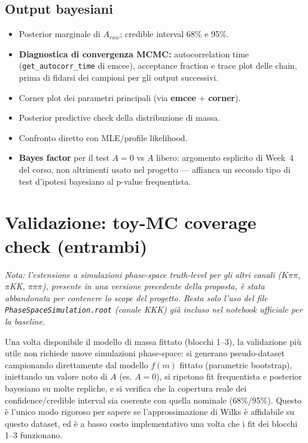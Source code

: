 \documentclass[11pt,a4paper]{article}
\begin{document}
\subsection*{Output bayesiani}
\begin{itemize}[leftmargin=1.4em]
    \item Posterior marginale di $A_{raw}$; credible interval 68\% e 95\%.
    \item \textbf{Diagnostica di convergenza MCMC:} autocorrelation time (\texttt{get\_autocorr\_time} di emcee), acceptance fraction e trace plot delle chain, prima di fidarsi dei campioni per gli output successivi.
    \item Corner plot dei parametri principali (via \textbf{emcee} + \textbf{corner}).
    \item Posterior predictive check della distribuzione di massa.
    \item Confronto diretto con MLE/profile likelihood.
    \item \textbf{Bayes factor} per il test $A=0$ vs $A$ libero: argomento esplicito di Week~4 del corso, non altrimenti usato nel progetto --- affianca un secondo tipo di test d'ipotesi bayesiano al p-value frequentista.
\end{itemize}

\section{Validazione: toy-MC coverage check \textnormal{\small(entrambi)}}

\emph{Nota: l'estensione a simulazioni phase-space truth-level per gli altri canali ($K\pi\pi$, $\pi$KK, $\pi\pi\pi$), presente in una versione precedente della proposta, è stata abbandonata per contenere lo scope del progetto. Resta solo l'uso del file \texttt{PhaseSpaceSimulation.root} (canale KKK) già incluso nel notebook ufficiale per la baseline.}

Una volta disponibile il modello di massa fittato (blocchi 1--3), la validazione più utile non richiede nuove simulazioni phase-space: si generano pseudo-dataset campionando direttamente dal modello $f(m)$ fittato (parametric bootstrap), iniettando un valore noto di $A$ (es. $A=0$), si ripetono fit frequentista e posterior bayesiano su molte repliche, e si verifica che la copertura reale dei confidence/credible interval sia coerente con quella nominale (68\%/95\%). Questo è l'unico modo rigoroso per sapere se l'approssimazione di Wilks è affidabile su questo dataset, ed è a basso costo implementativo una volta che i fit dei blocchi 1--3 funzionano.
\end{document}
